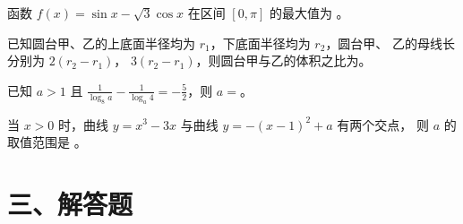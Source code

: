 \documentclass[UTF8,12pt]{ctexart}
\newcommand{\blank}{\underline{\hspace{4em}}}   %
\begin{document}
\begin{questions}[start=13]

  \item 函数 $f(x) = \sin x - \sqrt{3} \cos x$ 在区间 $[0, \pi]$ 的最大值为 \blank。

  \item 已知圆台甲、乙的上底面半径均为 $r_1$，下底面半径均为 $r_2$，圆台甲、
    乙的母线长分别为 $2(r_2 - r_1)$， $3(r_2 - r_1)$，则圆台甲与乙的体积之比为\blank。

  \item 已知 $a > 1$ 且 $\frac{1}{\log_8 a} - \frac{1}{\log_a 4} = -\frac{5}{2}$，则
    $a =$\blank。

  \item 当 $x > 0$ 时，曲线 $y = x^{3} - 3x$ 与曲线 $y = -(x - 1)^{2} + a$ 有两个交点，
    则 $a$ 的取值范围是 \blank。

\end{questions}

\section*{三、解答题}
\end{document}
